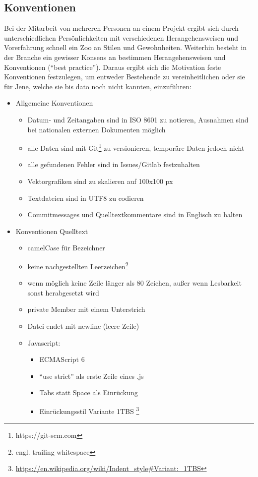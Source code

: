 \subsection{Konventionen}
Bei der Mitarbeit von mehreren Personen an einem Projekt ergibt sich durch unterschiedlichen Persönlichkeiten mit verschiedenen Herangehensweisen und Vorerfahrung schnell ein Zoo an Stilen und Gewohnheiten. Weiterhin besteht  in der Branche ein gewisser Konsens an bestimmen Herangehensweisen und Konventionen ("`best practice"'). Daraus ergibt sich die Motivation feste Konventionen festzulegen, um entweder Bestehende zu vereinheitlichen oder sie für Jene, welche sie bis dato noch nicht kannten, einzuführen:
\begin{itemize}
\item Allgemeine Konventionen
	\begin{itemize}
	\item Datum- und Zeitangaben sind in ISO 8601 zu notieren, Ausnahmen sind bei nationalen externen Dokumenten möglich
	\item alle Daten sind mit Git\footnote{https://git-scm.com} zu versionieren, temporäre Daten jedoch nicht
	\item alle gefundenen Fehler sind in Issues/Gitlab festzuhalten
	\item Vektorgrafiken sind zu skalieren auf 100x100 px
	\item Textdateien sind in UTF8 zu codieren
	\item Commitmessages und Quelltextkommentare sind in Englisch zu halten
	\end{itemize}
\item Konventionen Quelltext
	\begin{itemize}
	\item camelCase für Bezeichner
	\item keine nachgestellten Leerzeichen\footnote{engl. trailing whitespace}
	\item wenn möglich keine Zeile länger als 80 Zeichen, außer wenn Lesbarkeit sonst herabgesetzt wird
	\item private Member mit einem Unterstrich
	\item Datei endet mit newline (leere Zeile)
	\item Javascript:
		\begin{itemize}
		\item ECMAScript 6
		\item "`use strict"' als erste Zeile eines .js
		\item Tabs statt Space als Einrückung
		\item Einrückungsstil Variante 1TBS \footnote{\url{https://en.wikipedia.org/wiki/Indent_style\#Variant:_1TBS}}
		\end{itemize}
	\end{itemize}
\end{itemize}


